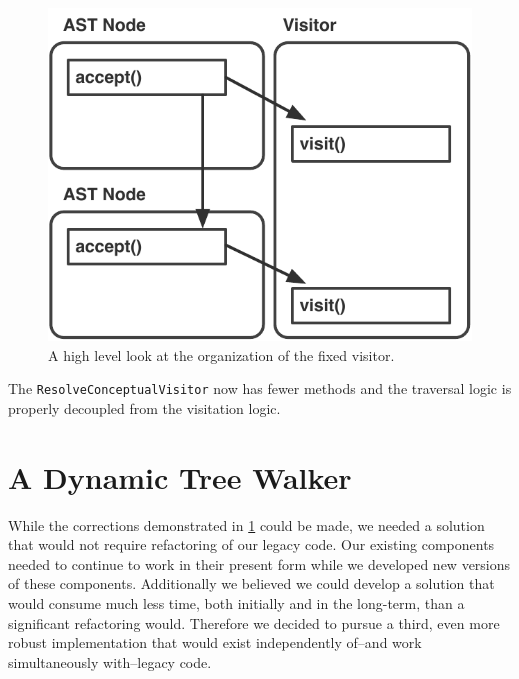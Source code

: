 \documentclass[times]{speauth}
\begin{document}
\begin{figure}[!htb]
\centering
\includegraphics[scale=.60]{figures/fixed_visitor_organization.pdf}
\caption{A high level look at the organization of the fixed visitor.}
\label{fig:fixedvisitororganization}
\end{figure}

The \texttt{ResolveConceptualVisitor} now has fewer methods and the traversal logic is properly decoupled from the visitation logic.


\section{A Dynamic Tree Walker}
While the corrections demonstrated in \ref{fig:fixedvisitororganization} could be made, we needed a solution that would not require refactoring of our legacy code. Our existing components needed to continue to work in their present form while we developed new versions of these components. Additionally we believed we could develop a solution that would consume much less time, both initially and in the long-term, than a significant refactoring would. Therefore we decided to pursue a third, even more robust implementation that would exist independently of--and work simultaneously with--legacy code.
\end{document}
